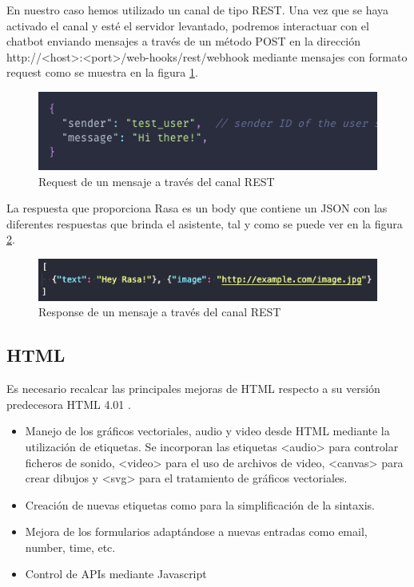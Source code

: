 En nuestro caso hemos utilizado un canal de tipo REST. Una vez que se haya activado el canal y esté el servidor levantado, podremos interactuar con el chatbot enviando mensajes a través de un método POST en la dirección http://<host>:<port>/web-hooks/rest/webhook mediante mensajes con formato request como se muestra en la figura \ref{fig:rasa_request}. 

\begin{figure}[H]
    \centering
    \includegraphics[width=\textwidth]{include/capturas/RasaRequest.png}
    \caption{Request de un mensaje a través del canal REST}
    \label{fig:rasa_request}
\end{figure}


La respuesta que proporciona Rasa es un body que contiene un JSON con las diferentes respuestas que brinda el asistente, tal y como se puede ver en la figura \ref{fig:rasa_response}.

\begin{figure}[H]
    \centering
    \includegraphics[width=\textwidth]{include/capturas/RasaResponse.png}
    \caption{Response de un mensaje a través del canal REST}
    \label{fig:rasa_response}
\end{figure}

\subsection{HTML}

Es necesario recalcar las principales mejoras de HTML respecto a su versión predecesora HTML 4.01 \cite{lujan2011html5}.

\begin{itemize}
    \item Manejo de los gráficos vectoriales, audio y video desde HTML mediante la utilización de etiquetas. Se incorporan las etiquetas <audio> para controlar ficheros de sonido, <video> para el uso de archivos de video, <canvas> para crear dibujos y <svg> para el tratamiento de gráficos vectoriales.
    \item Creación de nuevas etiquetas como para la simplificación de la sintaxis.
    \item Mejora de los formularios adaptándose a nuevas entradas como email, number, time, etc.
    \item Control de APIs mediante Javascript
\end{itemize}

